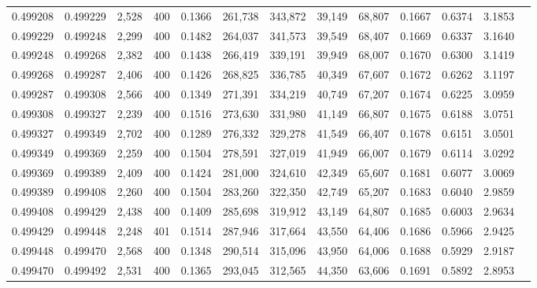 \begin{tabular}{rrrrrrrrrrrrr}
0.499208 & 0.499229 & 2,528 & 400 &                                     0.1366 & 261,738 & 343,872 &  39,149 &  68,807 & 0.1667 & 0.6374 & 3.1853 \\
0.499229 & 0.499248 & 2,299 & 400 &                                     0.1482 & 264,037 & 341,573 &  39,549 &  68,407 & 0.1669 & 0.6337 & 3.1640 \\
0.499248 & 0.499268 & 2,382 & 400 &                                     0.1438 & 266,419 & 339,191 &  39,949 &  68,007 & 0.1670 & 0.6300 & 3.1419 \\
0.499268 & 0.499287 & 2,406 & 400 &                                     0.1426 & 268,825 & 336,785 &  40,349 &  67,607 & 0.1672 & 0.6262 & 3.1197 \\
0.499287 & 0.499308 & 2,566 & 400 &                                     0.1349 & 271,391 & 334,219 &  40,749 &  67,207 & 0.1674 & 0.6225 & 3.0959 \\
0.499308 & 0.499327 & 2,239 & 400 &                                     0.1516 & 273,630 & 331,980 &  41,149 &  66,807 & 0.1675 & 0.6188 & 3.0751 \\
0.499327 & 0.499349 & 2,702 & 400 &                                     0.1289 & 276,332 & 329,278 &  41,549 &  66,407 & 0.1678 & 0.6151 & 3.0501 \\
0.499349 & 0.499369 & 2,259 & 400 &                                     0.1504 & 278,591 & 327,019 &  41,949 &  66,007 & 0.1679 & 0.6114 & 3.0292 \\
0.499369 & 0.499389 & 2,409 & 400 &                                     0.1424 & 281,000 & 324,610 &  42,349 &  65,607 & 0.1681 & 0.6077 & 3.0069 \\
0.499389 & 0.499408 & 2,260 & 400 &                                     0.1504 & 283,260 & 322,350 &  42,749 &  65,207 & 0.1683 & 0.6040 & 2.9859 \\
0.499408 & 0.499429 & 2,438 & 400 &                                     0.1409 & 285,698 & 319,912 &  43,149 &  64,807 & 0.1685 & 0.6003 & 2.9634 \\
0.499429 & 0.499448 & 2,248 & 401 &                                     0.1514 & 287,946 & 317,664 &  43,550 &  64,406 & 0.1686 & 0.5966 & 2.9425 \\
0.499448 & 0.499470 & 2,568 & 400 &                                     0.1348 & 290,514 & 315,096 &  43,950 &  64,006 & 0.1688 & 0.5929 & 2.9187 \\
0.499470 & 0.499492 & 2,531 & 400 &                                     0.1365 & 293,045 & 312,565 &  44,350 &  63,606 & 0.1691 & 0.5892 & 2.8953 \\

\end{tabular}
